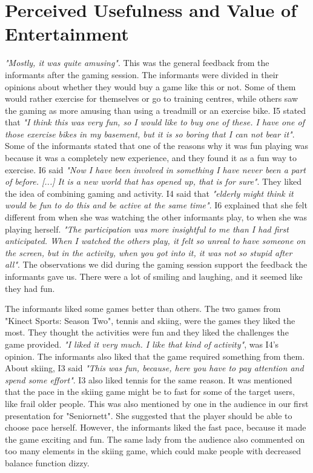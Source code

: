 \section{Perceived Usefulness and Value of Entertainment}
\emph{"Mostly, it was quite amusing"}. This was the general feedback from the informants after the gaming session. The informants were divided in their opinions about whether they would buy a game like this or not. Some of them would rather exercise for themselves or go to training centres, while others saw the gaming as more amusing than using a treadmill or an exercise bike. I5 stated that \emph{"I think this was very fun, so I would like to buy one of these. I have one of those exercise bikes in my basement, but it is so boring that I can not bear it"}.  Some of the informants stated that one of the reasons why it was fun playing was because it was a completely new experience, and they found it as a fun way to exercise. I6 said \emph{"Now I have been involved in something I have never been a part of before. [...] It is a new world that has opened up, that is for sure"}.  They liked the idea of combining gaming and activity. I4 said that \emph{"elderly might think it would be fun to do this and be active at the same time"}. I6 explained that she felt different from when she was watching the other informants play, to when she was playing herself. \emph{"The participation was more insightful to me than I had first anticipated. When I watched the others play, it felt so unreal to have someone on the screen, but in the activity, when you got into it, it was not so stupid after all"}. The observations we did during the gaming session support the feedback the informants gave us. There were a lot of smiling and laughing, and it seemed like they had fun.  

The informants liked some games better than others. The two games from "Kinect Sports: Season Two", tennis and skiing, were the games they liked the most. They thought the activities were fun and they liked the challenges the game provided. \emph{"I liked it very much. I like that kind of activity"}, was I4's opinion. The informants also liked that the game required something from them. About skiing, I3 said \emph{"This was fun, because, here you have to pay attention and spend some effort"}. I3 also liked tennis for the same reason. It was mentioned that the pace in the skiing game might be to fast for some of the target users, like frail older people. This was also mentioned by one in the audience in our first presentation for "Seniornett". She suggested that the player should be able to choose pace herself. However, the informants liked the fast pace, because it made the game exciting and fun. The same lady from the audience also commented on too many elements in the skiing game, which could make people with decreased balance function dizzy. 

